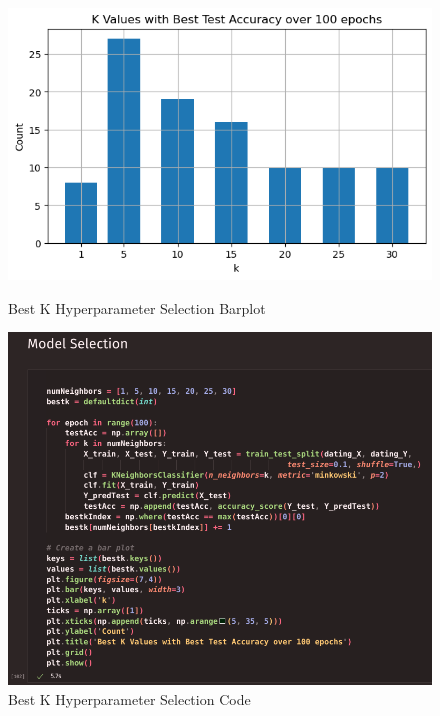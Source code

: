 \documentclass{article}
\begin{document}
    \begin{figure}[H]
        \centering
        \begin{minipage}[t]{0.45\textwidth}
            \centering
            \includegraphics[width=\textwidth, height=0.2\textheight]{k-NN_selection.png}
            \caption{\small{Best K Hyperparameter Selection Barplot}}
        \end{minipage}
        \hfill
        \begin{minipage}[t]{0.54\textwidth}
            \centering
            \includegraphics[width=\textwidth, height=0.25\textheight]{k-NN_selection_code.png}
            \caption{\small{Best K Hyperparameter Selection Code}}
        \end{minipage}
    \end{figure}
\end{document}
